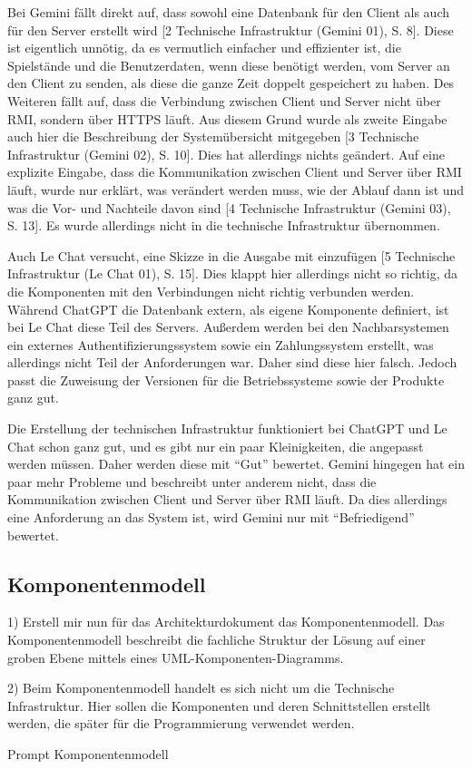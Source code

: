 Bei Gemini fällt direkt auf, dass sowohl eine Datenbank für den Client als auch für den Server erstellt wird [2 Technische Infrastruktur (Gemini 01), S. 8]. Diese ist eigentlich unnötig, da es 
vermutlich einfacher und effizienter ist, die Spielstände und die Benutzerdaten, wenn diese benötigt werden, vom Server an den Client zu senden, als 
diese die ganze Zeit doppelt gespeichert zu haben. Des Weiteren fällt auf, dass die Verbindung zwischen Client und Server nicht über RMI, sondern über 
HTTPS läuft. Aus diesem Grund wurde als zweite Eingabe auch hier die Beschreibung der Systemübersicht mitgegeben [3 Technische Infrastruktur (Gemini 02), S. 10]. Dies hat allerdings nichts geändert. 
Auf eine explizite Eingabe, dass die Kommunikation zwischen Client und Server über RMI läuft, wurde nur erklärt, was verändert werden muss, wie der Ablauf 
dann ist und was die Vor- und Nachteile davon sind [4 Technische Infrastruktur (Gemini 03), S. 13]. Es wurde allerdings nicht in die technische Infrastruktur übernommen.

Auch Le Chat versucht, eine Skizze in die Ausgabe mit einzufügen [5 Technische Infrastruktur (Le Chat 01), S. 15]. Dies klappt hier allerdings nicht so richtig, da die Komponenten mit den 
Verbindungen nicht richtig verbunden werden. Während ChatGPT die Datenbank extern, als eigene Komponente definiert, ist bei Le Chat diese 
Teil des Servers. Außerdem werden bei den Nachbarsystemen ein externes Authentifizierungssystem sowie ein Zahlungssystem erstellt, was 
allerdings nicht Teil der Anforderungen war. Daher sind diese hier falsch. Jedoch passt die Zuweisung der Versionen für die 
Betriebssysteme sowie der Produkte ganz gut.

Die Erstellung der technischen Infrastruktur funktioniert bei ChatGPT und Le Chat schon ganz gut, und es gibt nur ein paar Kleinigkeiten, die 
angepasst werden müssen. Daher werden diese mit ``Gut'' bewertet. Gemini hingegen hat ein paar mehr Probleme und beschreibt unter anderem nicht, 
dass die Kommunikation zwischen Client und Server über RMI läuft. Da dies allerdings eine Anforderung an das System ist, wird Gemini nur mit 
``Befriedigend'' bewertet.

\subsection*{Komponentenmodell}

\begin{prompt}[H]
    \begin{tcolorbox}[colback=gray!20, colframe=gray!20, boxrule=0pt, sharp corners] 
        1) Erstell mir nun für das Architekturdokument das Komponentenmodell. Das Komponentenmodell beschreibt die fachliche Struktur der Lösung auf 
        einer groben Ebene mittels eines UML-Komponenten-Diagramms.
        
        2) Beim Komponentenmodell handelt es sich nicht um die Technische Infrastruktur. Hier sollen die Komponenten und deren Schnittstellen erstellt 
        werden, die später für die Programmierung verwendet werden.
        \vfill
    \end{tcolorbox}
    \caption{Prompt Komponentenmodell}
    \label{Prompt Komponentenmodell}
\end{prompt}

